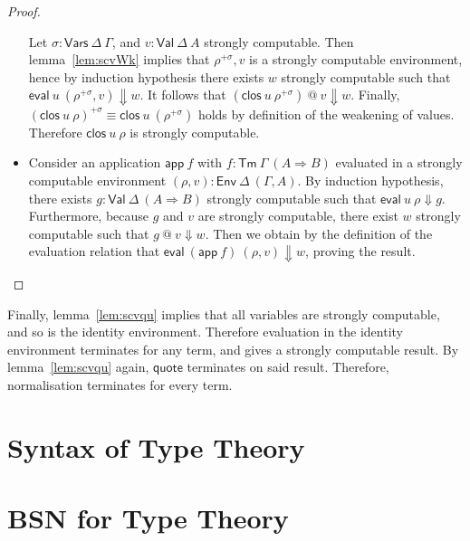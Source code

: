 \documentclass[a4paper,english,cleveref,autoref,draft]{lipics-v2019}
\newcommand{\agdaSymb}[1]{\mathsf{#1}}
\newcommand{\Tm}{\agdaSymb{Tm}}
\newcommand{\app}{\agdaSymb{app}}
\newcommand{\Vars}{\agdaSymb{Vars}}
\newcommand{\Val}{\agdaSymb{Val}}
\newcommand{\Env}{\agdaSymb{Env}}
\newcommand{\clos}{\agdaSymb{clos}}
\newcommand{\eval}{\agdaSymb{eval}}
\newcommand{\q}{\agdaSymb{quote}}
\newcommand{\Ra}{\Rightarrow}
\newcommand{\Da}{\Downarrow}
\begin{document}
\begin{proof}
\begin{itemize}
    Let $\sigma : \Vars\ \Delta\ \Gamma$, and $v : \Val\ \Delta\ A$ strongly
    computable. Then lemma~\ref{lem:scvWk} implies that $\rho^{+\sigma},v$ is a
    strongly computable environment, hence by induction hypothesis there exists
    $w$ strongly computable such that $\eval\ u\ (\rho^{+\sigma},v) \Da w$.
    It follows that $(\clos\ u\ \rho^{+\sigma})\ @\ v \Da w$. Finally,
    $(\clos\ u\ \rho)^{+\sigma} \equiv \clos\ u\ (\rho^{+\sigma})$ holds by definition
    of the weakening of values. Therefore $\clos\ u\ \rho$ is strongly computable.
  \item Consider an application $\app\ f$ with $f : \Tm\ \Gamma\ (A \Ra B)$
    evaluated in a strongly computable environment $(\rho,v) : \Env\ \Delta\ (\Gamma,A)$.
    By induction hypothesis, there exists $g : \Val\ \Delta\ (A \Ra B)$
    strongly computable such that $\eval\ u\ \rho \Da g$. Furthermore, because
    $g$ and $v$ are strongly computable, there exist $w$ strongly computable such that
    $g\ @\ v \Da w$. Then we obtain by the definition of the evaluation relation that
    $\eval\ (\app\ f)\ (\rho,v) \Da w$, proving the result.
  \end{itemize}
\end{proof}

Finally, lemma~\ref{lem:scvqu} implies that all variables are strongly
computable, and so is the identity environment. Therefore evaluation in the
identity environment terminates for any term, and gives a strongly computable
result. By lemma~\ref{lem:scvqu} again, $\q$ terminates on said result.
Therefore, normalisation terminates for every term.


\section{Syntax of Type Theory}

\section{BSN for Type Theory}


\end{document}

